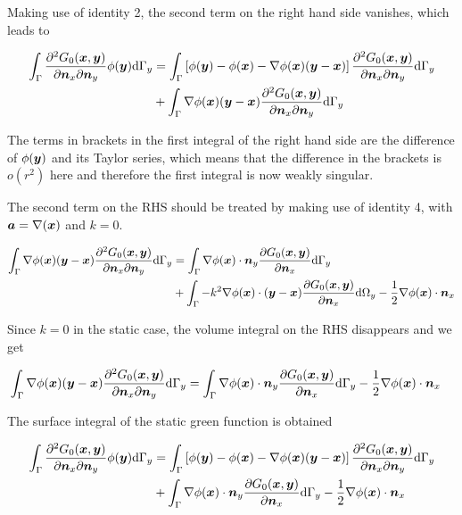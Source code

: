 \documentclass[a4paper, 10pt]{article}
\newcommand{\td}{\mathrm{d}}
\newcommand{\sa}{\bm{\mathnormal{a}}}
\newcommand{\sx}{\bm{\mathnormal{x}}}
\newcommand{\sy}{\bm{\mathnormal{y}}}
\newcommand{\sn}{\bm{\mathnormal{n}}}
\begin{document}
Making use of identity 2, the second term on the right hand side vanishes, which leads to

\begin{align}
	\int_\Gamma \frac{\partial^2 G_0(\sx, \sy)}{\partial \sn_x \partial \sn_y} \phi(\sy) \td \Gamma_y & =
	\int_\Gamma \left[\phi(\sy) - \phi(\sx) - \nabla \phi(\sx) (\sy - \sx) \right] \frac{\partial^2 G_0(\sx, \sy)}{\partial \sn_x \partial \sn_y} \td \Gamma_y \nonumber \\
	& + \int_\Gamma \nabla \phi(\sx) (\sy - \sx) \frac{\partial^2 G_0(\sx, \sy)}{\partial \sn_x \partial \sn_y} \td \Gamma_y
\end{align}

The terms in brackets in the first integral of the right hand side are the difference of $\phi(\sy)$ and its Taylor series, which means that the difference in the brackets is $o(r^2)$ here and therefore the first integral is now weakly singular.

The second term on the RHS should be treated by making use of identity 4, with $\sa = \nabla(\sx)$ and $k = 0$.

\begin{align}
	\int_\Gamma \nabla \phi(\sx) (\sy - \sx) \frac{\partial^2 G_0(\sx, \sy)}{\partial \sn_x \partial \sn_y} \td \Gamma_y & = 
	\int_\Gamma \nabla \phi(\sx) \cdot \sn_y \frac{\partial G_0(\sx,\sy)}{\partial \sn_x} \td \Gamma_y \nonumber \\
	&+ \int_\Gamma -k^2 \nabla \phi(\sx) \cdot (\sy - \sx) \frac{\partial G_0(\sx, \sy)}{\partial \sn_x} \td \Omega_y
	-\frac{1}{2} \nabla \phi(\sx) \cdot \sn_x
\end{align}

Since $k = 0$ in the static case, the volume integral on the RHS disappears and we get

\begin{align}
	\int_\Gamma \nabla \phi(\sx) (\sy - \sx) \frac{\partial^2 G_0(\sx, \sy)}{\partial \sn_x \partial \sn_y} \td \Gamma_y & = 
	\int_\Gamma \nabla \phi(\sx) \cdot \sn_y \frac{\partial G_0(\sx,\sy)}{\partial \sn_x} \td \Gamma_y -\frac{1}{2} \nabla \phi(\sx) \cdot \sn_x
\end{align}

The surface integral of the static green function is obtained

\begin{align}
	\int_\Gamma \frac{\partial^2 G_0(\sx, \sy)}{\partial \sn_x \partial \sn_y} \phi(\sy) \td \Gamma_y & = \int_\Gamma \left[\phi(\sy) - \phi(\sx) - \nabla \phi(\sx) (\sy - \sx) \right] \frac{\partial^2 G_0(\sx, \sy)}{\partial \sn_x \partial \sn_y} \td \Gamma_y \nonumber \\
	& + \int_\Gamma \nabla \phi(\sx) \cdot \sn_y \frac{\partial G_0(\sx,\sy)}{\partial \sn_x} \td \Gamma_y -\frac{1}{2} \nabla \phi(\sx) \cdot \sn_x
\end{align}
\end{document}
